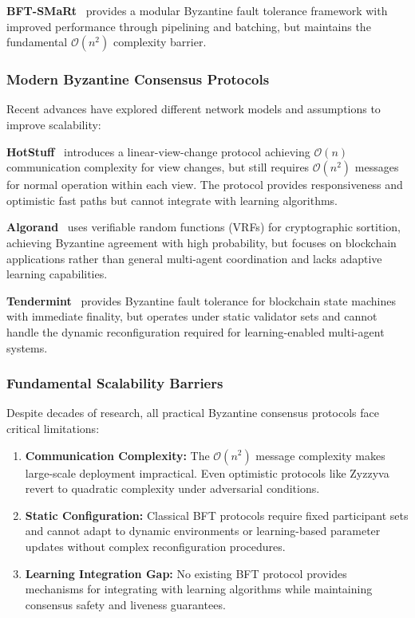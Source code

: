 \documentclass[conference]{IEEEtran}
\newcommand{\bigO}{\mathcal{O}}
\begin{document}
\textbf{BFT-SMaRt}~\cite{bessani2014state} provides a modular Byzantine fault tolerance framework with improved performance through pipelining and batching, but maintains the fundamental $\bigO(n^2)$ complexity barrier.

\subsubsection{Modern Byzantine Consensus Protocols}

Recent advances have explored different network models and assumptions to improve scalability:

\textbf{HotStuff}~\cite{yin2019hotstuff} introduces a linear-view-change protocol achieving $\bigO(n)$ communication complexity for view changes, but still requires $\bigO(n^2)$ messages for normal operation within each view. The protocol provides responsiveness and optimistic fast paths but cannot integrate with learning algorithms.

\textbf{Algorand}~\cite{gilad2017algorand} uses verifiable random functions (VRFs) for cryptographic sortition, achieving Byzantine agreement with high probability, but focuses on blockchain applications rather than general multi-agent coordination and lacks adaptive learning capabilities.

\textbf{Tendermint}~\cite{kwon2014tendermint} provides Byzantine fault tolerance for blockchain state machines with immediate finality, but operates under static validator sets and cannot handle the dynamic reconfiguration required for learning-enabled multi-agent systems.

\subsubsection{Fundamental Scalability Barriers}

Despite decades of research, all practical Byzantine consensus protocols face critical limitations:

\begin{enumerate}
    \item \textbf{Communication Complexity:} The $\bigO(n^2)$ message complexity makes large-scale deployment impractical. Even optimistic protocols like Zyzzyva revert to quadratic complexity under adversarial conditions.
    
    \item \textbf{Static Configuration:} Classical BFT protocols require fixed participant sets and cannot adapt to dynamic environments or learning-based parameter updates without complex reconfiguration procedures.
    
    \item \textbf{Learning Integration Gap:} No existing BFT protocol provides mechanisms for integrating with learning algorithms while maintaining consensus safety and liveness guarantees.
\end{enumerate}
\end{document}
